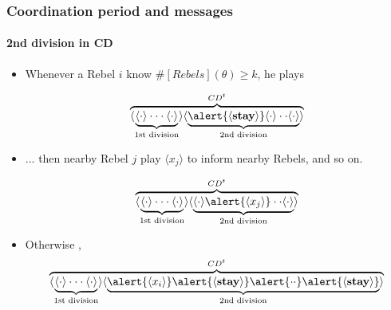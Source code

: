 \documentclass[9pt]{beamer}
\begin{document}
\begin{frame}
\frametitle{Coordination period and messages}


\framesubtitle{2nd division in CD}

\begin{itemize}
\item Whenever a Rebel $i$ know \alert{$\#[Rebels](\theta)\geq k$}, he plays

\[\overbrace{\langle\underbrace{\langle \cdot \rangle \cdot \cdot \cdot \langle \cdot \rangle}_{\text{1st division}}\rangle \langle\underbrace{\alert{\langle \textbf{stay} \rangle} \langle \cdot \rangle \cdot \cdot \langle \cdot \rangle}_{\text{2nd division}} \rangle }^{CD^t}\] 

\pause

\item ... then nearby Rebel $j$ \alert{play $\langle x_j \rangle$} to inform nearby Rebels, and so on.

\[\overbrace{\langle\underbrace{\langle \cdot \rangle \cdot \cdot \cdot \langle \cdot \rangle}_{\text{1st division}}\rangle \langle\underbrace{{\langle \cdot \rangle} \alert{\langle x_j \rangle} \cdot \cdot \langle \cdot \rangle}_{\text{2nd division}} \rangle }^{CD^t}\] 

\pause

\item {Otherwise} ,
\[\overbrace{\langle\underbrace{\langle \cdot \rangle \cdot \cdot \cdot \langle \cdot \rangle}_{\text{1st division}}\rangle \langle\underbrace{\alert{\langle x_i \rangle} \alert{\langle \textbf{stay} \rangle} \alert{ \cdot \cdot }\alert{\langle \textbf{stay} \rangle} }_{\text{2nd division}} \rangle }^{CD^t}\]
\end{itemize}

\end{frame}
\end{document}
